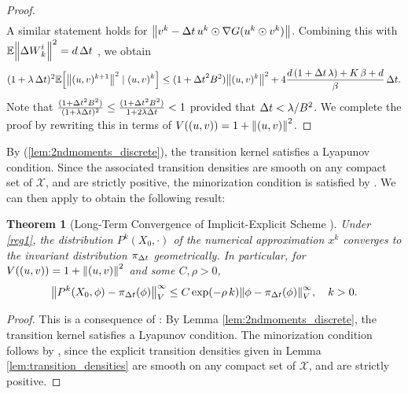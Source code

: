 \documentclass[11pt, twoside]{report}
\newtheorem{theorem}{Theorem}[section]
\begin{document}
\begin{proof}
\begin{align*}
    \end{align*}
   A similar statement holds for $\left\lVert v^k-{\Delta t}\, u^k \odot \nabla G(u^k \odot v^k)\right\rVert$.
    Combining this with $ \EE\norm{ \deltaw^i_k}^2= d\,\Delta t$ , we obtain  
    \begin{align*}
    (1+\lambda \,\deltat)^2 \EE\Bigl[\norm{(u,v)^{k+1}}^2 \mid (u,v)^k\Bigr] \leq (1+\deltat^2 \cinfty^2)\norm{(u,v)^{k}}^2  + 
    4{ \frac{d\,( 1 + \deltat \,\lambda) + \ccc\,\beta + d}{\beta}}\,\deltat.
    \end{align*}
    Note that
    $
    \frac{(1+{\Delta t}^2 B^2)}{(1+\lambda {\Delta t})^2} \leq \frac{(1+{\Delta t}^2 B^2)}{1+2\lambda {\Delta t}} <1
    $
    provided that ${\Delta t}  < \lambda/B^2 $. We complete the proof by rewriting this in terms of $V((u,v))=1+\left\lVert(u,v)\right\rVert^2$.
\end{proof}

By  (\ref{lem:2ndmoments_discrete}), the transition kernel satisfies a Lyapunov condition. Since the associated transition densities are smooth on any compact set of $\mathcal X$, and are strictly positive, the minorization condition is satisfied by \cite[Lemma 2.3]{mattingly2002ergodicity}. We can then apply \cite[Theorem 2.25]{Lelievre2016-hx} to obtain the following result:
\begin{theorem}[Long-Term Convergence of Implicit-Explicit Scheme \texorpdfstring{\cite[Theorem~4.2]{2025hadalangsamp}}{}]
\label{num_erg} Under \ref{reg1}, the distribution $P^k(X_0,\cdot)$ of the numerical approximation $x^k$  converges to the invariant distribution $\pi_{{\Delta t}}$ geometrically. In particular, for $V((u,v))=1+\left\lVert(u,v)\right\rVert^2$ and some $C,\rho>0$,
    \[\norm{ P^k(X_0,\phi )  - \pi_{\deltat}(\phi)}^\infty_V\le  C \exp(-\rho\, k) \norm{\phi-\pi_\tstep(\phi)}^\infty_V,\quad k>0.
    \]
\end{theorem}

\begin{proof}
    This is a consequence of \cite[Theorem 2.25]{Lelievre2016-hx}: By  Lemma \ref{lem:2ndmoments_discrete}, the transition kernel satisfies a Lyapunov condition. The minorization condition  follows by \cite[Lemma 2.3]{mattingly2002ergodicity}, since  the  explicit transition densities given in Lemma \ref{lem:transition_densities} are smooth on any compact set of $\mathcal X$, and are strictly positive.
\end{proof}
\end{document}
